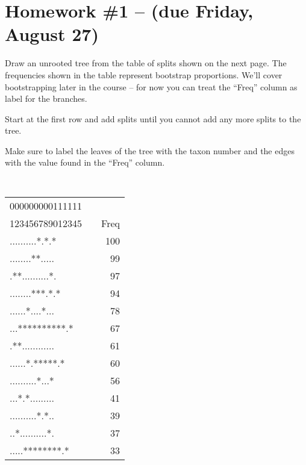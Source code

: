 \documentclass[landscape]{foils}
\begin{document}
\pagecolor{white}
\unitlength=1mm
\section*{Homework \#1 -- (due Friday, August 27)}
\normalsize
Draw an unrooted tree from the table of splits shown on the next page.
The frequencies shown in the table represent bootstrap proportions.
We'll cover bootstrapping later in the course -- for now you can treat
the ``Freq'' column as label for the branches.

Start at the first row and add splits until you cannot add any more
splits to the tree.

Make sure to label the leaves of the tree with the taxon number
and the edges with the value found in the ``Freq'' column.



\myNewSlide
\begin{center}
{\tt 
\begin{tabular}{|lp{0.1cm}r|}
\hline
000000000111111 & & \\
123456789012345 & & Freq \\
\hline
..........*.*.* & & 100 \\
........**..... & & 99 \\
.**..........*. & & 97 \\
........***.*.* & & 94 \\
......*....*... & & 78 \\
...**********.* & & 67 \\
.**............ & & 61 \\
......*.*****.* & & 60 \\
..........*...* & & 56 \\
...*.*......... & & 41 \\
..........*.*.. & & 39 \\
..*..........*. & & 37 \\
.....********.* & & 33 \\
\hline
\end{tabular}
}
\end{center}
\end{document}

